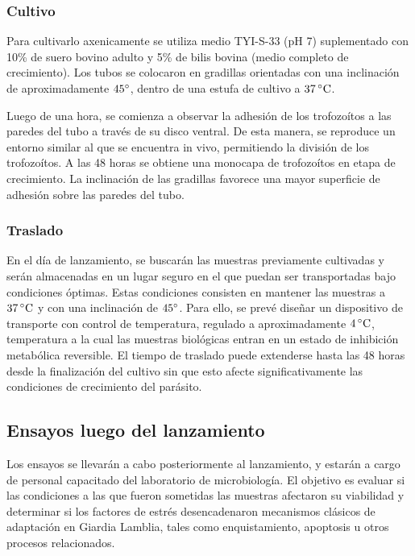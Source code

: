     \subsubsection{Cultivo}
    Para cultivarlo axenicamente se utiliza medio TYI-S-33 (pH 7) suplementado con 10\% de suero
    bovino adulto y 5\% de bilis bovina (medio completo de crecimiento). Los tubos se colocaron en gradillas orientadas
    con una inclinación de aproximadamente $45^{\circ}$, dentro de una estufa de cultivo a $37 \,^\circ\mathrm{C}$.

    Luego de una hora, se comienza a observar la adhesión de los trofozoítos a las paredes del tubo a través de su disco
    ventral. De esta manera, se reproduce un entorno similar al que se encuentra in vivo, permitiendo la división de los
    trofozoítos. A las 48 horas se obtiene una monocapa de trofozoítos en etapa de crecimiento. La inclinación de las
    gradillas favorece una mayor superficie de adhesión sobre las paredes del tubo.

    \subsubsection{Traslado}
    En el día de lanzamiento, se buscarán las muestras previamente cultivadas y serán almacenadas en un lugar seguro
    en el que puedan ser transportadas bajo condiciones óptimas. Estas condiciones consisten en mantener las muestras a $37\,^\circ\mathrm{C}$ y con una inclinación de
    $45^{\circ}$. Para ello, se prevé diseñar un dispositivo de transporte con control de temperatura, regulado a
    aproximadamente $4\,^\circ\mathrm{C}$, temperatura a la cual las muestras biológicas entran en un estado de inhibición metabólica
    reversible. El tiempo de traslado puede extenderse hasta las 48 horas desde la finalización del cultivo sin que esto afecte
    significativamente las condiciones de crecimiento del parásito.

  \subsection{Ensayos luego del lanzamiento}
  \label{sec:procedimientos-ensayo}
   Los ensayos se llevarán a cabo posteriormente al lanzamiento, y estarán a cargo de personal capacitado del laboratorio
   de microbiología. El objetivo es evaluar si las condiciones a las que fueron sometidas las muestras afectaron su viabilidad
   y determinar si los factores de estrés desencadenaron mecanismos clásicos de adaptación en Giardia Lamblia, tales como
   enquistamiento, apoptosis u otros procesos relacionados.
   
